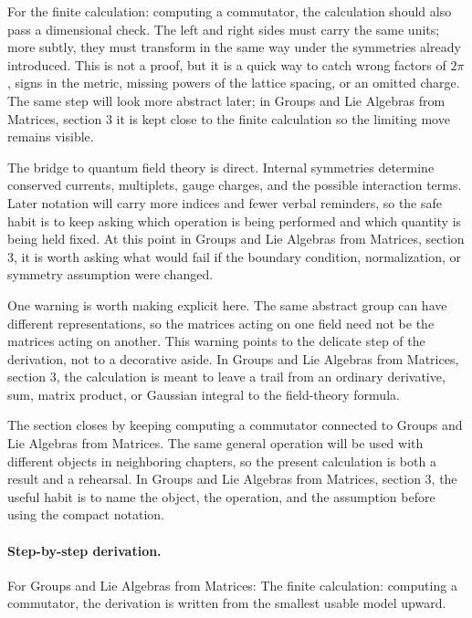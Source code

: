 For the finite calculation: computing a commutator, the calculation should also pass a dimensional check.  The left and right sides must carry the same units; more subtly, they must transform in the same way under the symmetries already introduced.  This is not a proof, but it is a quick way to catch wrong factors of \(2\pi\), signs in the metric, missing powers of the lattice spacing, or an omitted charge.  The same step will look more abstract later; in Groups and Lie Algebras from Matrices, section 3 it is kept close to the finite calculation so the limiting move remains visible.

The bridge to quantum field theory is direct.  Internal symmetries determine conserved currents, multiplets, gauge charges, and the possible interaction terms.  Later notation will carry more indices and fewer verbal reminders, so the safe habit is to keep asking which operation is being performed and which quantity is being held fixed.  At this point in Groups and Lie Algebras from Matrices, section 3, it is worth asking what would fail if the boundary condition, normalization, or symmetry assumption were changed.

One warning is worth making explicit here.  The same abstract group can have different representations, so the matrices acting on one field need not be the matrices acting on another.  This warning points to the delicate step of the derivation, not to a decorative aside.  In Groups and Lie Algebras from Matrices, section 3, the calculation is meant to leave a trail from an ordinary derivative, sum, matrix product, or Gaussian integral to the field-theory formula.

The section closes by keeping computing a commutator connected to Groups and Lie Algebras from Matrices.  The same general operation will be used with different objects in neighboring chapters, so the present calculation is both a result and a rehearsal.  In Groups and Lie Algebras from Matrices, section 3, the useful habit is to name the object, the operation, and the assumption before using the compact notation.



\paragraph{Step-by-step derivation.}

For Groups and Lie Algebras from Matrices: The finite calculation: computing a commutator, the derivation is written from the smallest usable model upward.


